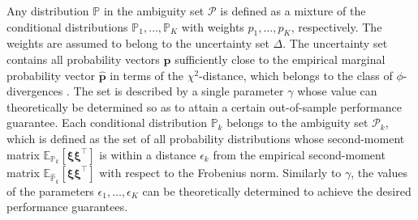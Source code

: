 \documentclass{article}
\newcommand{\PP}{\mathbb{P}}
\newcommand{\EE}{\mathbb{E}}
\begin{document}
Any distribution $\PP$ in the ambiguity set $\mathcal P$ is defined as a mixture of the conditional distributions $\PP_1,\ldots,\PP_K$ with weights $p_1,\ldots,p_K$, respectively. The weights are assumed to belong to the uncertainty set $\Delta$. The uncertainty set contains all probability vectors $\bm p$ sufficiently close to the empirical marginal probability vector $\hat{\bm p}$ in terms of the $\chi^2$-distance, which belongs to the class of $\phi$-divergences \cite{phi-divergence}. The set is described by a single parameter $\gamma$ whose value can  theoretically be determined so as to attain a certain out-of-sample performance guarantee. %
Each conditional distribution $\PP_k$ belongs to the ambiguity set $\mathcal P_k$, which is defined as the set of all probability distributions whose second-moment matrix $\EE_{\PP_k} [\bm\xi\bm\xi^\top]$ is within a distance $\epsilon_k$  from the empirical second-moment matrix $\EE_{{\hat{\PP}}_k}[\bm\xi\bm\xi^\top]$ with respect to the Frobenius norm. %
Similarly to $\gamma$, the values of the parameters $\epsilon_1,\ldots,\epsilon_K$ can be theoretically determined to achieve the desired performance guarantees. 
\end{document}

